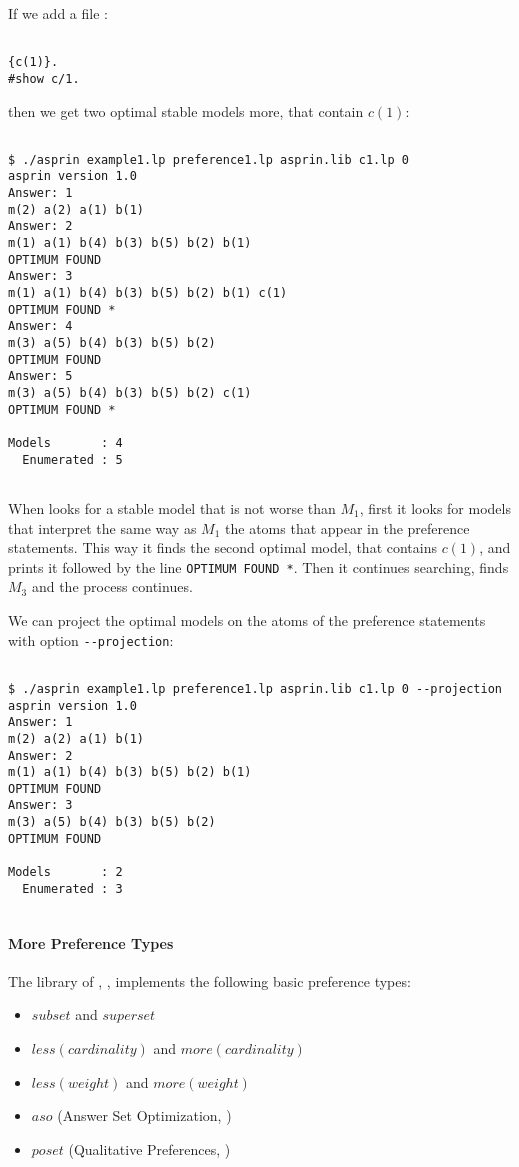 If we add a file : 
\begin{verbatim}

{c(1)}.
#show c/1.
\end{verbatim}
then we get two optimal stable models more, that contain $c(1)$: 
\begin{verbatim}

$ ./asprin example1.lp preference1.lp asprin.lib c1.lp 0
asprin version 1.0
Answer: 1
m(2) a(2) a(1) b(1)
Answer: 2
m(1) a(1) b(4) b(3) b(5) b(2) b(1)
OPTIMUM FOUND
Answer: 3
m(1) a(1) b(4) b(3) b(5) b(2) b(1) c(1)
OPTIMUM FOUND *
Answer: 4
m(3) a(5) b(4) b(3) b(5) b(2)
OPTIMUM FOUND
Answer: 5
m(3) a(5) b(4) b(3) b(5) b(2) c(1)
OPTIMUM FOUND *

Models       : 4
  Enumerated : 5
  
\end{verbatim}
When \asprin looks for a stable model that is not worse than $M_1$,  
first it looks for models that interpret the same way as $M_1$ the atoms that appear in the preference statements. 
This way it finds the second optimal model, that contains $c(1)$, and prints it followed by the line \lstinline{OPTIMUM FOUND *}.  
Then it continues searching, finds $M_3$ and the process continues. 

We can project the optimal models on the atoms of the preference statements with option \lstinline{--projection}: 
\begin{verbatim}

$ ./asprin example1.lp preference1.lp asprin.lib c1.lp 0 --projection
asprin version 1.0
Answer: 1
m(2) a(2) a(1) b(1)
Answer: 2
m(1) a(1) b(4) b(3) b(5) b(2) b(1)
OPTIMUM FOUND
Answer: 3
m(3) a(5) b(4) b(3) b(5) b(2)
OPTIMUM FOUND

Models       : 2
  Enumerated : 3
  
\end{verbatim}

\paragraph{More Preference Types}

The library of \asprin, , implements the following basic preference types:  
\begin{itemize}
	\item  $subset$ and $superset$   
	\item  $less(cardinality)$ and $more(cardinality)$   
	\item  $less(weight)$ and $more(weight)$   
	\item  $aso$   (Answer Set Optimization, \cite{brnitr03a})   
	\item  $poset$ (Qualitative Preferences, \cite{rogima10a})  
\end{itemize}

